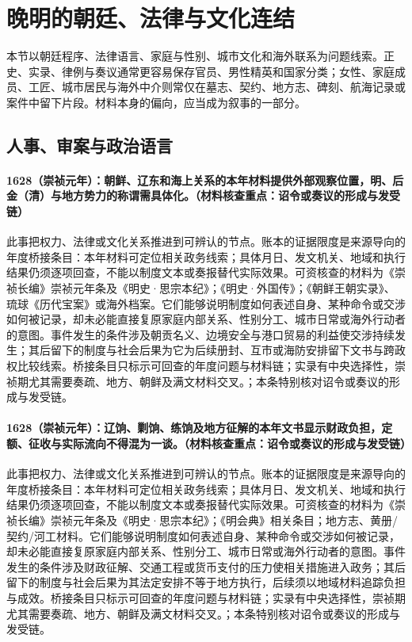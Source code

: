 \section{晚明的朝廷、法律与文化连结}

本节以朝廷程序、法律语言、家庭与性别、城市文化和海外联系为问题线索。正史、实录、律例与奏议通常更容易保存官员、男性精英和国家分类；女性、家庭成员、工匠、城市居民与海外中介则常仅在墓志、契约、地方志、碑刻、航海记录或案件中留下片段。材料本身的偏向，应当成为叙事的一部分。

\subsection{人事、审案与政治语言}

\paragraph{1628（崇祯元年）：朝鲜、辽东和海上关系的本年材料提供外部观察位置，明、后金（清）与地方势力的称谓需具体化。（材料核查重点：诏令或奏议的形成与发受链）} 此事把权力、法律或文化关系推进到可辨认的节点。账本的证据限度是来源导向的年度桥接条目：本年材料可定位相关政务线索；具体月日、发文机关、地域和执行结果仍须逐项回查，不能以制度文本或奏报替代实际效果。可资核查的材料为《崇祯长编》崇祯元年条及《明史·思宗本纪》；《明史·外国传》；《朝鲜王朝实录》、琉球《历代宝案》或海外档案。它们能够说明制度如何表述自身、某种命令或交涉如何被记录，却未必能直接复原家庭内部关系、性别分工、城市日常或海外行动者的意图。事件发生的条件涉及朝贡名义、边境安全与港口贸易的利益使交涉持续发生；其后留下的制度与社会后果为它为后续册封、互市或海防安排留下文书与跨政权比较线索。桥接条目只标示可回查的年度问题与材料链；实录有中央选择性，崇祯期尤其需要奏疏、地方、朝鲜及满文材料交叉。；本条特别核对诏令或奏议的形成与发受链。

\paragraph{1628（崇祯元年）：辽饷、剿饷、练饷及地方征解的本年文书显示财政负担，定额、征收与实际流向不得混为一谈。（材料核查重点：诏令或奏议的形成与发受链）} 此事把权力、法律或文化关系推进到可辨认的节点。账本的证据限度是来源导向的年度桥接条目：本年材料可定位相关政务线索；具体月日、发文机关、地域和执行结果仍须逐项回查，不能以制度文本或奏报替代实际效果。可资核查的材料为《崇祯长编》崇祯元年条及《明史·思宗本纪》；《明会典》相关条目；地方志、黄册/契约/河工材料。它们能够说明制度如何表述自身、某种命令或交涉如何被记录，却未必能直接复原家庭内部关系、性别分工、城市日常或海外行动者的意图。事件发生的条件涉及财政征解、交通工程或货币支付的压力使相关措施进入政务；其后留下的制度与社会后果为其法定安排不等于地方执行，后续须以地域材料追踪负担与成效。桥接条目只标示可回查的年度问题与材料链；实录有中央选择性，崇祯期尤其需要奏疏、地方、朝鲜及满文材料交叉。；本条特别核对诏令或奏议的形成与发受链。

